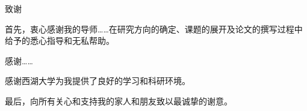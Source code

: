 \cleardoublepage{}
{}
\begin{center}
    \heiti{} 致谢
\end{center}

首先，衷心感谢我的导师……在研究方向的确定、课题的展开及论文的撰写过程中给予的悉心指导和无私帮助。

感谢……

感谢西湖大学为我提供了良好的学习和科研环境。

最后，向所有关心和支持我的家人和朋友致以最诚挚的谢意。
